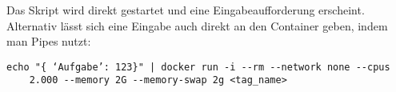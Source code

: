 Das Skript wird direkt gestartet und eine Eingabeaufforderung erscheint. 
Alternativ lässt sich eine Eingabe auch direkt an den Container geben, indem man Pipes nutzt:
\begin{verbatim}echo "{ ‘Aufgabe’: 123}" | docker run -i --rm --network none --cpus 
	2.000 --memory 2G --memory-swap 2g <tag_name>\end{verbatim}




